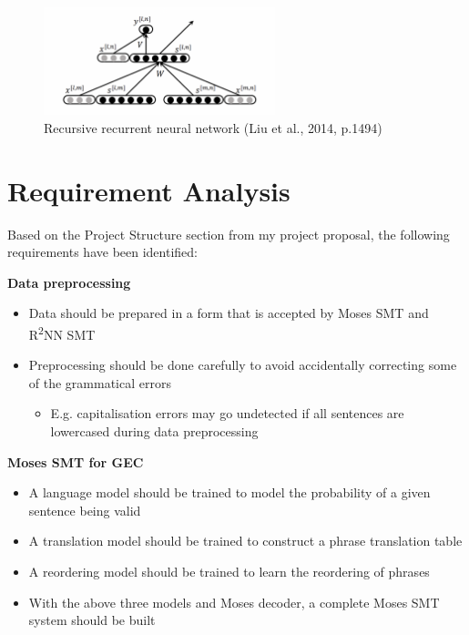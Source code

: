 \documentclass[12pt,a4paper,twoside,openright]{report}
\begin{document}
\begin{figure}[ht]
\centering
\includegraphics[width=0.6\textwidth]{images/r2nn.png}
\caption{Recursive recurrent neural network (Liu et al., 2014, p.1494)}
\label{fig:r2nn}
\end{figure}


\section{Requirement Analysis}

Based on the Project Structure section from my project proposal, the following requirements have been identified:

\textbf{Data preprocessing}
\begin{itemize}
    \item Data should be prepared in a form that is accepted by Moses SMT and R\textsuperscript{2}NN SMT
    \item Preprocessing should be done carefully to avoid accidentally correcting some of the grammatical errors 
    
    \begin{itemize}
        \item E.g. capitalisation errors may go undetected if all sentences are lowercased during data preprocessing
    \end{itemize}
\end{itemize}

\textbf{Moses SMT for GEC}
\begin{itemize}
    \item A language model should be trained to model the probability of a given sentence being valid
    \item A translation model should be trained to construct a phrase translation table
    \item A reordering model should be trained to learn the reordering of phrases
    \item With the above three models and Moses decoder, a complete Moses SMT system should be built
\end{itemize}
\end{document}
